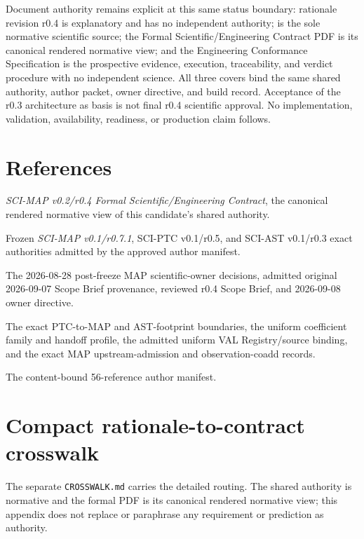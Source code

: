 \documentclass[10pt]{article}
\newcommand{\code}[1]{\nolinkurl{#1}}
\begin{document}
Document authority remains explicit at this same status boundary: rationale
revision r0.4 is explanatory and has no independent authority;
\SCIMapSharedAuthorityId{} is the sole normative scientific source; the Formal
Scientific/Engineering Contract PDF is its canonical rendered normative view;
and the Engineering Conformance Specification is the prospective evidence,
execution, traceability, and verdict procedure with no independent science.
All three covers bind the same shared authority, author packet, owner directive,
and build record. Acceptance of the r0.3 architecture as basis is not final
r0.4 scientific approval. No implementation, validation, availability,
readiness, or production claim follows.

\section*{References}
\begin{enumerate}[label={[\arabic*]},leftmargin=*]
\item \emph{SCI-MAP v0.2/r0.4 Formal Scientific/Engineering Contract}, the canonical rendered normative view of this candidate's shared authority.
\item Frozen \emph{SCI-MAP v0.1/r0.7.1}, SCI-PTC v0.1/r0.5, and SCI-AST v0.1/r0.3 exact authorities admitted by the approved author manifest.
\item The 2026-08-28 post-freeze MAP scientific-owner decisions, admitted original 2026-09-07 Scope Brief provenance, reviewed r0.4 Scope Brief, and 2026-09-08 owner directive.
\item The exact PTC-to-MAP and AST-footprint boundaries, the uniform
coefficient family and handoff profile, the admitted uniform VAL
Registry/source binding, and the exact MAP upstream-admission and
observation-coadd records.
\item The content-bound 56-reference author manifest.
\end{enumerate}

\clearpage\appendix
\section{Compact rationale-to-contract crosswalk}\label{app:crosswalk}
The separate \code{CROSSWALK.md} carries the detailed routing. The shared
authority is normative and the formal PDF is its canonical rendered normative
view; this appendix does not replace or paraphrase any requirement or
prediction as authority.
\end{document}
